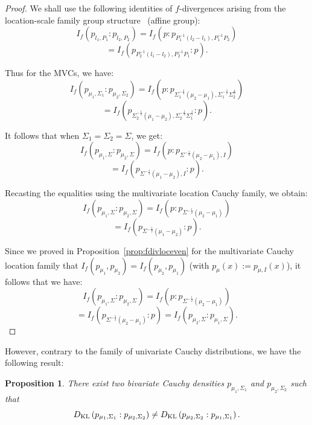 \documentclass[journal]{IEEEtran}
\newtheorem{proposition}[theorem]{Proposition}
\begin{document}
\begin{proof}
We shall use the following identities of $f$-divergences arising from the location-scale family group structure~\cite{infproj-2021} (affine group):
$$
I_{f}\left(p_{l_{1}, P_{1}}: p_{l_{2}, P_{2}}\right)=
I_{f}\left(p: p_{P_{1}^{-1}\left(l_{2}-l_{1}\right), P_{1}^{-1} P_{2}}\right)$$
$$
=I_{f}\left(p_{P_{2}^{-1}\left(l_{1}-l_{2}\right), P_{2}^{-1} P_{1}}: p\right).
$$

Thus for the MVCs, we have:
$$
I_{f}\left(p_{\mu_{1}, \Sigma_{1}}: p_{\mu_{2}, \Sigma_{2}}\right)=
I_{f}\left(p : p_{\Sigma_1^{-\frac{1}{2}}\left(\mu_{2}-\mu_{1}\right), \Sigma_1^{-\frac{1}{2}} \Sigma_2^{\frac{1}{2}}}\right)$$
$$
=I_{f}\left(p_{\Sigma_2^{-\frac{1}{2}}\left(\mu_{1}-\mu_{2}\right), \Sigma_2^{-\frac{1}{2}} \Sigma_1^{\frac{1}{2}}}: p\right).
$$

It follows that when $\Sigma_1=\Sigma_2=\Sigma$, we get:
$$
I_{f}\left(p_{\mu_{1}, \Sigma}: p_{\mu_{2}, \Sigma}\right)=
I_{f}\left(p : p_{\Sigma^{-\frac{1}{2}}\left(\mu_{2}-\mu_{1}\right), I}\right)$$
$$
=I_{f}\left(p_{\Sigma^{-\frac{1}{2}}\left(\mu_{1}-\mu_{2}\right), I}: p\right).
$$

Recasting the equalities using the multivariate location Cauchy family, we obtain:
$$
I_{f}\left(p_{\mu_{1}, \Sigma}: p_{\mu_{2}, \Sigma}\right)=
I_{f}\left(p : p_{\Sigma^{-\frac{1}{2}}\left(\mu_{2}-\mu_{1}\right)}\right)$$
$$
=I_{f}\left(p_{\Sigma^{-\frac{1}{2}}\left(\mu_{1}-\mu_{2}\right)}: p\right).
$$

Since we proved in Proposition~\ref{prop:fdivloceven} for the multivariate Cauchy location family that $I_f(p_{\mu_1},p_{\mu_2})=I_f(p_{\mu_2},p_{\mu_1})$ (with $p_{\mu}(x) := p_{\mu, I}(x)$),
 it follows that we have:
$$
I_{f}\left(p_{\mu_{1}, \Sigma}: p_{\mu_{2}, \Sigma}\right)=
I_{f}\left(p : p_{\Sigma^{-\frac{1}{2}}\left(\mu_{2}-\mu_{1}\right)}\right)$$
$$
=
I_{f}\left(p_{\Sigma^{-\frac{1}{2}}\left(\mu_{2}-\mu_{1}\right)}:p\right)
=
I_{f}\left(p_{\mu_{2}, \Sigma}: p_{\mu_{1}, \Sigma}\right).
$$
\end{proof}

However, contrary to the family of univariate Cauchy distributions, we have the following result: 

\begin{proposition}\label{prop:locDiffSigma}
There exist two bivariate Cauchy densities $p_{\mu_1, \Sigma_1}$ 
and $p_{\mu_2, \Sigma_2}$ such that 
$$
D_{\mathrm{KL}}\left(p_{\mu_1, \Sigma_1}: p_{\mu_2, \Sigma_2} \right) \not=
D_{\mathrm{KL}}\left(p_{\mu_2, \Sigma_2}: p_{\mu_1, \Sigma_1} \right).$$
\end{proposition}
\end{document}

